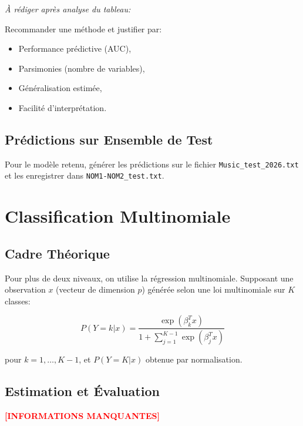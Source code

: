 \documentclass[11pt,a4paper,french]{report}
\begin{document}
\textit{À rédiger après analyse du tableau:}

Recommander une méthode et justifier par:
\begin{itemize}
    \item Performance prédictive (AUC),
    \item Parsimonies (nombre de variables),
    \item Généralisation estimée,
    \item Facilité d'interprétation.
\end{itemize}

\section{Prédictions sur Ensemble de Test}

Pour le modèle retenu, générer les prédictions sur le fichier \texttt{Music\_test\_2026.txt} et les enregistrer dans \texttt{NOM1-NOM2\_test.txt}.

\newpage


\chapter{Classification Multinomiale}

\section{Cadre Théorique}

Pour plus de deux niveaux, on utilise la régression multinomiale. Supposant une observation $x$ (vecteur de dimension $p$) générée selon une loi multinomiale sur $K$ classes:

\begin{equation}
P(Y=k | x) = \frac{\exp(\beta_k^T x)}{1 + \sum_{j=1}^{K-1} \exp(\beta_j^T x)}
\end{equation}

pour $k = 1, \ldots, K-1$, et $P(Y=K|x)$ obtenue par normalisation.

\section{Estimation et Évaluation}

\textcolor{red}{\textbf{[INFORMATIONS MANQUANTES]}}
\end{document}
